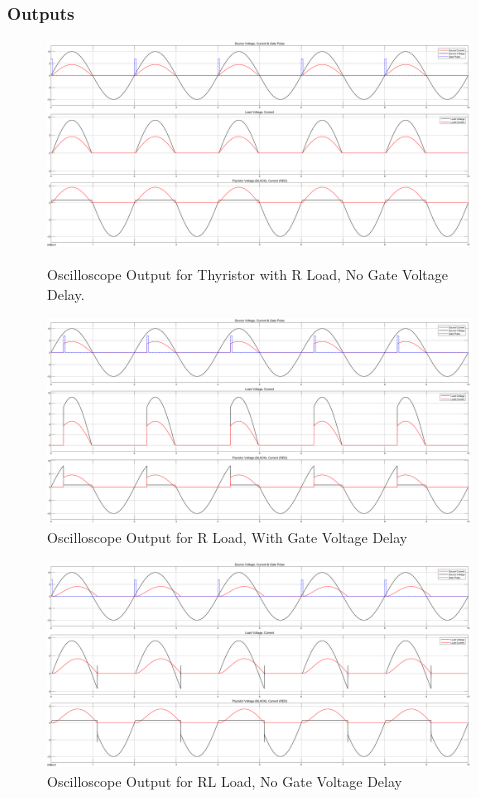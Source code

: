 \documentclass[12pt]{article}
\begin{document}
\subsubsection*{Outputs}
\begin{figure}[H]
    \centering
    \includegraphics[width=\textwidth]{r.png}
    \caption{}
    Oscilloscope Output for Thyristor with R Load, No Gate Voltage Delay.
    \label{fig:rLoad}
\end{figure}

\begin{figure}[H]
    \centering
    \includegraphics[width=\textwidth]{r_delay.png}
    \caption{Oscilloscope Output for R Load, With Gate Voltage Delay}
    \label{fig:rLoadDelay}
\end{figure}

\begin{figure}[H]
    \centering
    \includegraphics[width=\textwidth]{rl.png}
    \caption{Oscilloscope Output for RL Load, No Gate Voltage Delay}
    \label{fig:rlLoad}
\end{figure}
\end{document}
